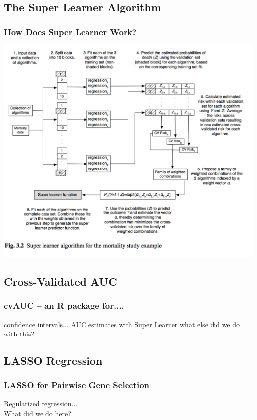 \documentclass{beamer}
\begin{document}
\subsection{The Super Learner Algorithm}

\begin{frame}
	\frametitle{How Does Super Learner Work?}
		\begin{center}
    			\includegraphics[scale=0.45]{../paper/figs/SuperLearn2.png}
		\end{center}
\end{frame}

\subsection{Cross-Validated AUC}

\begin{frame}[fragile]
  	\frametitle{cvAUC -- an R package for....}
 		confidence intervals...
		AUC estimates with Super Learner
		what else did we do with this?
\end{frame}

\subsection{LASSO Regression}

\begin{frame}[fragile]
  	\frametitle{LASSO for Pairwise Gene Selection}
 		Regularized regression... \\
		What did we do here?
\end{frame}
\end{document}
